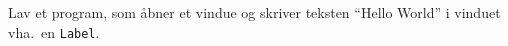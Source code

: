 Lav et program, som åbner et vindue og skriver teksten ``Hello
  World'' i vinduet vha.\ en \lstinline{Label}.
